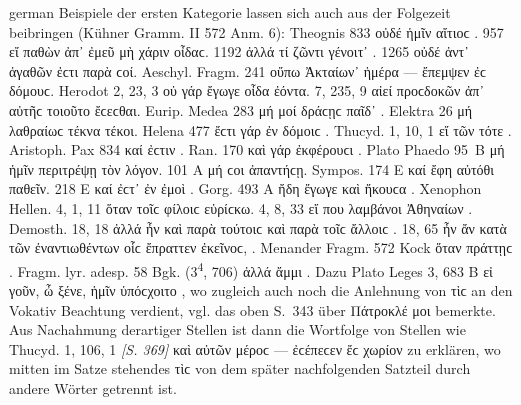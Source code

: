 \begin{otherlanguage*}{german}
Beispiele der ersten Kategorie lassen sich auch aus der Folgezeit beibringen (Kühner Gramm. II 572 Anm. 6): Theognis 833 οὐδέ  ἡμῖν αἴτιοϲ . 957 εἴ  παθὼν ἀπ᾽ ἐμεῦ  μὴ χάριν οἶδαϲ. 1192 ἀλλά τί  ζῶντι γένοιτ᾽ . 1265 οὐδέ  ἀντ᾽ ἀγαθῶν ἐϲτι  παρὰ ϲοί. Aeschyl. Fragm. 241 οὔπω  Ἀκταίων᾽  ἡμέρα — ἔπεμψεν ἐϲ δόμουϲ. Herodot 2, 23, 3 οὐ γάρ  ἔγωγε οἶδα  ἐόντα. 7, 235, 9 αἰεί  προϲδοκῶν ἀπ᾽ αὐτῆϲ τοιοῦτο ἔϲεϲθαι. Eurip. Medea 283 μή μοί  δράϲῃϲ παῖδ᾽ . Elektra 26 μή  λαθραίωϲ τέκνα  τέκοι. Helena 477 ἔϲτι γάρ  ἐν δόμοιϲ . Thucyd. 1, 10, 1 εἴ  τῶν τότε . Aristoph. Pax 834 καί  ἐϲτιν . Ran. 170 καὶ γάρ  ἐκφέρουϲι . Plato Phaedo 95~Β μή  ἡμῖν  περιτρέψῃ τὸν λόγον. 101 Α μή  ϲοι  ἀπαντήϲῃ. Sympos. 174 Ε καί  ἔφη αὐτόθι  παθεῖν. 218 Ε καί  ἐϲτ᾽ ἐν ἐμοὶ . Gorg. 493 Α ἤδη  ἔγωγε καὶ ἤκουϲα . Xenophon Hellen. 4, 1, 11 ὅταν  τοῖϲ φίλοιϲ  εὑρίϲκω. 4, 8, 33 εἴ  που λαμβάνοι Ἀθηναίων . Demosth. 18, 18 ἀλλά  ἦν  καὶ παρὰ τούτοιϲ καὶ παρὰ τοῖϲ ἄλλοιϲ . 18, 65 ἦν ἄν  κατὰ τῶν ἐναντιωθέντων οἷϲ ἔπραττεν ἐκεῖνοϲ, . Menander Fragm. 572 Kock ὅταν  πράττῃϲ . Fragm. lyr. adesp. 58 Bgk. (3\textsuperscript{4}, 706) ἀλλά  ἄμμι . Dazu Plato Leges 3, 683 Β εἰ γοῦν, ὦ ξένε,  ἡμῖν ὑπόϲχοιτο , wo zugleich auch noch die Anlehnung von τὶϲ an den Vokativ Beachtung verdient, vgl. das oben S.~343 über Πάτροκλέ μοι bemerkte. Aus Nachahmung derartiger Stellen ist dann die Wortfolge von Stellen wie Thucyd. 1, 106, 1 \hypertarget{p369}{\emph{[S. 369]}}\label{p369} καὶ αὐτῶν μέροϲ — ἐϲέπεϲεν ἔϲ  χωρίον  zu erklären, wo mitten im Satze stehendes τὶϲ von dem später nachfolgenden Satzteil durch andere Wörter getrennt ist.


\end{otherlanguage*}
